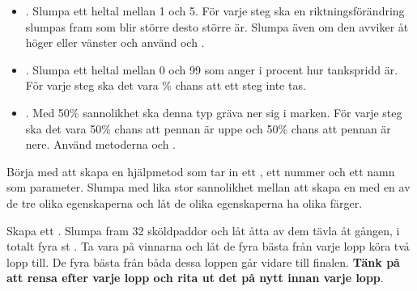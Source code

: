 \begin{itemize}

\item {}. Slumpa ett heltal  mellan 1 och 5. För varje steg ska en riktningsförändring slumpas fram som blir större desto större  är. Slumpa även om den avviker åt höger eller vänster och använd  och .

\item {}. Slumpa ett heltal  mellan 0 och 99 som anger i procent hur tankspridd  är. För varje steg ska det vara \% chans att ett steg inte tas.

\item {}. Med 50\% sannolikhet ska denna typ  gräva ner sig i marken. För varje steg ska det vara 50\% chans att pennan är uppe och 50\% chans att pennan är nere. Använd metoderna  och .

\end{itemize}

\Task {}

\Subtask Börja med att skapa en hjälpmetod  som tar in ett , ett nummer och ett namn som parameter. Slumpa med lika stor sannolikhet mellan att skapa en  med en av de tre olika egenskaperna och låt de olika egenskaperna ha olika färger.

\Subtask Skapa ett . Slumpa fram 32 sköldpaddor och låt åtta av dem tävla åt gången, i totalt fyra st   . Ta vara på vinnarna och låt de fyra bästa från varje lopp köra två lopp till. De fyra bästa från båda dessa loppen går vidare till finalen. \textbf{Tänk på att rensa  efter varje lopp och rita ut det på nytt innan varje lopp}.
